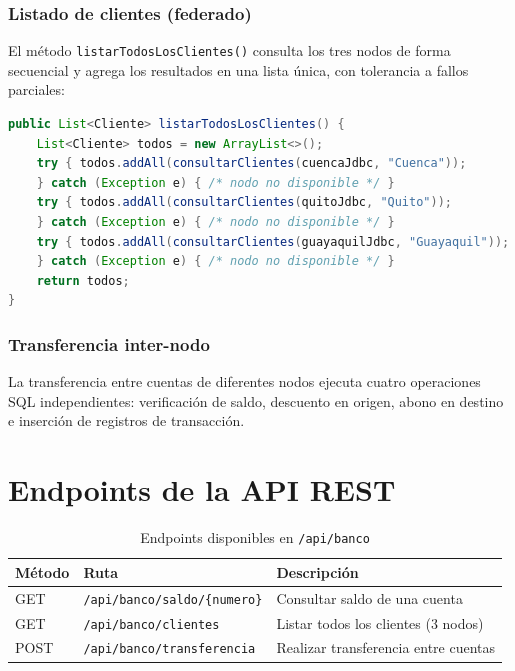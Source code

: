 \documentclass[12pt, a4paper]{article}
\begin{document}
\subsubsection{Listado de clientes (federado)}
El método \texttt{listarTodosLosClientes()} consulta los tres nodos de forma secuencial y agrega los resultados en una lista única, con tolerancia a fallos parciales:

\begin{lstlisting}[language=Java, caption={Consulta federada con tolerancia a fallos}]
public List<Cliente> listarTodosLosClientes() {
    List<Cliente> todos = new ArrayList<>();
    try { todos.addAll(consultarClientes(cuencaJdbc, "Cuenca"));
    } catch (Exception e) { /* nodo no disponible */ }
    try { todos.addAll(consultarClientes(quitoJdbc, "Quito"));
    } catch (Exception e) { /* nodo no disponible */ }
    try { todos.addAll(consultarClientes(guayaquilJdbc, "Guayaquil"));
    } catch (Exception e) { /* nodo no disponible */ }
    return todos;
}
\end{lstlisting}

\subsubsection{Transferencia inter-nodo}
La transferencia entre cuentas de diferentes nodos ejecuta cuatro operaciones SQL independientes: verificación de saldo, descuento en origen, abono en destino e inserción de registros de transacción.

\section{Endpoints de la API REST}

\begin{table}[H]
\centering
\caption{Endpoints disponibles en \texttt{/api/banco}}
\begin{tabular}{@{} l l l @{}}
\toprule
\textbf{Método} & \textbf{Ruta} & \textbf{Descripción} \\
\midrule
GET & \texttt{/api/banco/saldo/\{numero\}} & Consultar saldo de una cuenta \\
GET & \texttt{/api/banco/clientes} & Listar todos los clientes (3 nodos) \\
POST & \texttt{/api/banco/transferencia} & Realizar transferencia entre cuentas \\
\bottomrule
\end{tabular}
\end{table}
\end{document}
